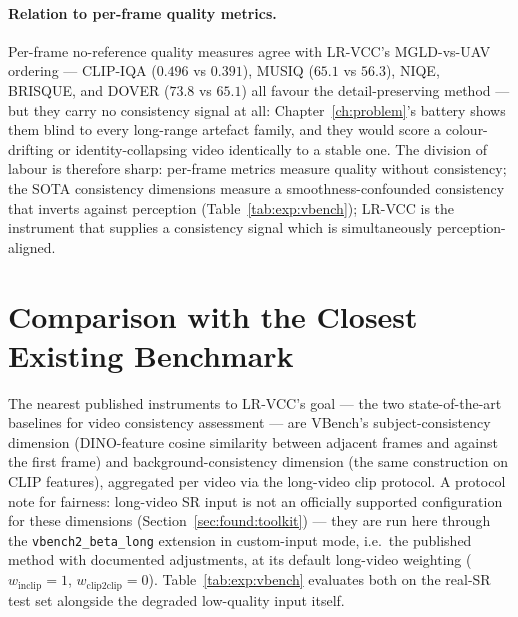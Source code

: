 \paragraph{Relation to per-frame quality metrics.} Per-frame no-reference
quality measures agree with LR-VCC's MGLD-vs-UAV ordering --- CLIP-IQA
($0.496$ vs $0.391$), MUSIQ ($65.1$ vs $56.3$), NIQE, BRISQUE, and DOVER
($73.8$ vs $65.1$) all favour the detail-preserving method --- but they carry
no consistency signal at all: Chapter~\ref{ch:problem}'s battery shows them
blind to every long-range artefact family, and they would score a
colour-drifting or identity-collapsing video identically to a stable one. The
division of labour is therefore sharp: per-frame metrics measure quality
without consistency; the SOTA consistency dimensions measure a
smoothness-confounded consistency that inverts against perception
(Table~\ref{tab:exp:vbench}); LR-VCC is the instrument that supplies a
consistency signal which is simultaneously perception-aligned.


\section{Comparison with the Closest Existing Benchmark}
\label{sec:exp:vbench}

The nearest published instruments to LR-VCC's goal --- the two
state-of-the-art baselines for video consistency assessment --- are VBench's
\cite{huang_vbench_2024} subject-consistency dimension (DINO-feature cosine
similarity between adjacent frames and against the first frame) and
background-consistency dimension (the same construction on CLIP features),
aggregated per video via the long-video clip protocol. A protocol note for
fairness: long-video SR input is not an officially supported configuration
for these dimensions (Section~\ref{sec:found:toolkit}) --- they are run here
through the \texttt{vbench2\_beta\_long} extension in custom-input mode,
i.e.\ the published method with documented adjustments, at its default
long-video weighting ($w_{\mathrm{inclip}}{=}1$,
$w_{\mathrm{clip2clip}}{=}0$). Table~\ref{tab:exp:vbench} evaluates both on
the real-SR test set alongside the degraded low-quality input itself.

